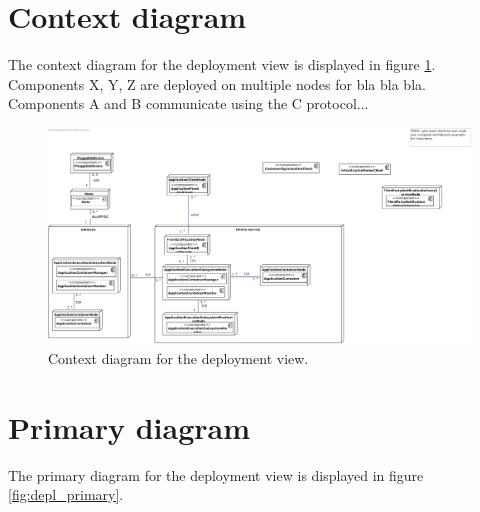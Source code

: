 
\showdeploynotes{}

\section{Context diagram}
    The context diagram for the deployment view is displayed in figure \ref{fig:depl_context}. \\

    Components X, Y, Z are deployed on multiple nodes for bla bla bla.\\
    Components A and B communicate using the C protocol...


    \begin{landscape}
        \centering
        \vspace*{\fill}

            \begin{figure}[!htp]
            	\centering
                \includegraphics[width=\textwidth]{images/deployment-context}
            	\caption{Context diagram for the deployment view.}\label{fig:depl_context}
            \end{figure}

        \vfill
    \end{landscape}


\section{Primary diagram}
    The primary diagram for the deployment view is displayed in figure \ref{fig:depl_primary}.

